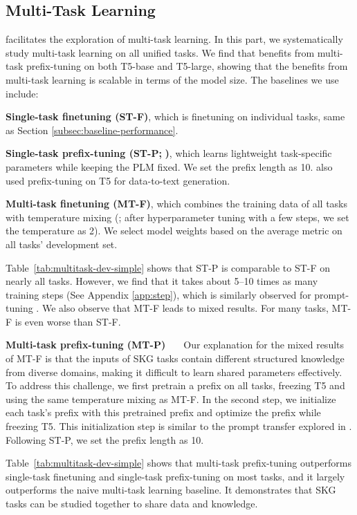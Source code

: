 \subsection{Multi-Task Learning}
\uskg facilitates the exploration of multi-task learning. In this part, we systematically study multi-task learning on all \ntasks unified tasks. We find that \skg benefits from multi-task prefix-tuning on both T5-base and T5-large, showing that the benefits from multi-task learning is scalable in terms of the model size. The baselines we use include:

\noindent\textbf{Single-task finetuning (ST-F)}, which is finetuning on individual tasks, same as Section \ref{subsec:baseline-performance}.

\noindent\textbf{Single-task prefix-tuning (ST-P;} \citealp{li2021prefixtuning}\textbf{)}, which learns lightweight task-specific parameters while keeping the PLM fixed. We set the prefix length as 10. \citet{Clive2021ControlPF} also used prefix-tuning on T5 for data-to-text generation. 

\noindent\textbf{Multi-task finetuning (MT-F)}, which combines the training data of all tasks with temperature mixing (\citealp{2020t5}; after hyperparameter tuning with a few steps, we set the temperature as 2). We select model weights based on the average metric on all tasks' development set.

Table~\ref{tab:multitask-dev-simple} shows that ST-P is comparable to ST-F on nearly all tasks. 
However, we find that it takes about 5--10 times as many training steps (See Appendix \ref{app:step}), which is similarly observed for prompt-tuning \cite{LesterAC21}. 
We also observe that MT-F leads to mixed results. 
For many tasks, MT-F is even worse than ST-F.

\noindent\textbf{Multi-task prefix-tuning (MT-P) \ \ } 
Our explanation for the mixed results of MT-F is that the inputs of SKG tasks contain different structured knowledge from diverse domains, making it difficult to learn shared parameters effectively. 
To address this challenge, we first pretrain a prefix on all tasks, freezing T5 and using the same temperature mixing as MT-F. In the second step, we initialize each task's prefix with this pretrained prefix and optimize the prefix while freezing T5. 
This initialization step is similar to the prompt transfer explored in \citet{vu2021spot}.
Following ST-P, we set the prefix length as 10. 

Table~\ref{tab:multitask-dev-simple} shows that multi-task prefix-tuning outperforms single-task finetuning and single-task prefix-tuning on most tasks, and it largely outperforms the naive multi-task learning baseline.
It demonstrates that SKG tasks can be studied together to share data and knowledge.

